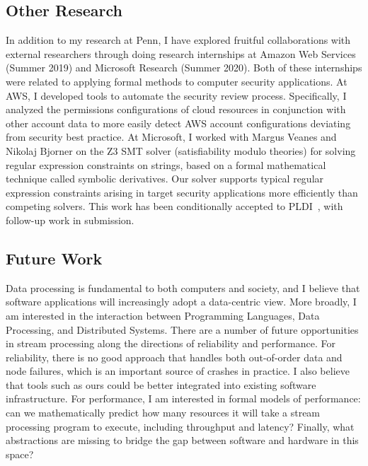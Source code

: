 \documentclass{article}
\begin{document}
\subsection*{Other Research}

In addition to my research at Penn, I have explored fruitful collaborations
with external researchers through doing research internships at Amazon Web Services (Summer 2019) and Microsoft Research (Summer 2020).
Both of these internships were related to applying formal methods to computer security applications.
At AWS, I developed tools to automate the security review process. Specifically, I analyzed the permissions configurations of cloud resources in conjunction with other account data to more easily detect AWS account configurations deviating from security best practice.
At Microsoft, I worked with Margus Veanes and Nikolaj Bjorner
on the Z3 SMT solver (satisfiability modulo theories)
for solving regular expression constraints on strings, based on a formal
mathematical technique called symbolic derivatives. Our solver supports typical regular expression constraints arising in target security applications
more efficiently than competing solvers.
This work has been conditionally accepted to PLDI~\cite{pldi21},
with follow-up work in submission.

\subsection*{Future Work}

Data processing is fundamental to both computers and society, and I believe that software applications will increasingly adopt a data-centric view.
More broadly, I am interested in the interaction between Programming Languages, Data Processing, and Distributed Systems.
There are a number of future opportunities in stream processing along the directions of reliability and performance.
For reliability,
there is no good approach that handles both out-of-order data and node failures, which is an important source of crashes in practice.
I also believe that tools such as ours could be better integrated into existing software infrastructure.
For performance,
I am interested in formal models of performance: can we mathematically predict how many resources it will take a stream processing program to execute,
including throughput and latency?
Finally, what abstractions are missing to bridge the gap between software and hardware in this space?



\end{document}
